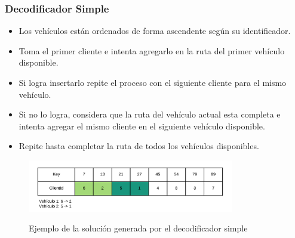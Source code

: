 \documentclass{beamer}
\begin{document}

\begin{frame}
\frametitle{Decodificador Simple}

\begin{itemize}
    \item Los vehículos están ordenados de forma ascendente según su identificador.
    \pause
    \item Toma el primer cliente e intenta agregarlo en la ruta del primer vehículo disponible.
    \pause
    \item Si logra insertarlo repite el proceso con el siguiente cliente para el mismo vehículo.
    \pause
    \item Si no lo logra, considera que la ruta del vehículo actual esta completa e intenta agregar el mismo cliente en el siguiente vehículo disponible.
    \pause
    \item Repite hasta completar la ruta de todos los vehículos disponibles.
    \pause
\end{itemize}

\begin{figure}[h]
	\caption{Ejemplo de la solución generada por el decodificador simple}
	\centering
	\includegraphics[width=9cm]{DistribucionClientesDecoSimple}
	\label{fig:DistribucionClientesDecoSimple}
\end{figure}

\end{frame}

\end{document}
